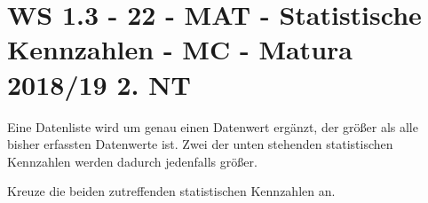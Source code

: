 \section{WS 1.3 - 22 - MAT - Statistische Kennzahlen - MC - Matura 2018/19 2. NT}

\begin{beispiel}[WS 1.3]{1}
Eine Datenliste wird um genau einen Datenwert ergänzt, der größer als alle bisher erfassten Datenwerte ist. Zwei der unten stehenden statistischen Kennzahlen werden dadurch jedenfalls größer.

Kreuze die beiden zutreffenden statistischen Kennzahlen an.

\end{beispiel}